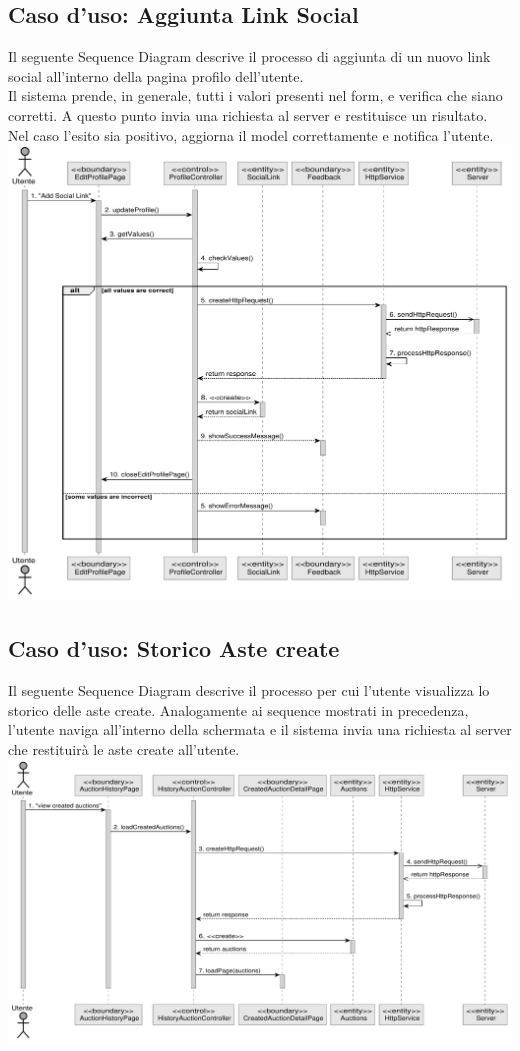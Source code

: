 \subsection{Caso d'uso: Aggiunta Link Social}
Il seguente Sequence Diagram descrive il processo di aggiunta di un nuovo link social all'interno della pagina profilo dell'utente.\\ 
Il sistema prende, in generale, tutti i valori presenti nel form, e verifica che siano corretti. A questo punto invia una richiesta al server e restituisce un risultato. Nel caso l'esito sia positivo, aggiorna il model correttamente e notifica l'utente.\bskip
\includegraphics[width=\textwidth]{assets/sequence/aggiungere_link_social.pdf}

\pagebreak
\subsection{Caso d'uso: Storico Aste create}
Il seguente Sequence Diagram descrive il processo per cui l'utente visualizza lo storico delle aste create. 
Analogamente ai sequence mostrati in precedenza, l'utente naviga all'interno della schermata e il sistema invia una richiesta al server che restituirà le aste create all'utente.\bskip
\includegraphics[width=\textwidth]{assets/sequence/visualizzazione_storico_aste_ancora_attive.pdf}
